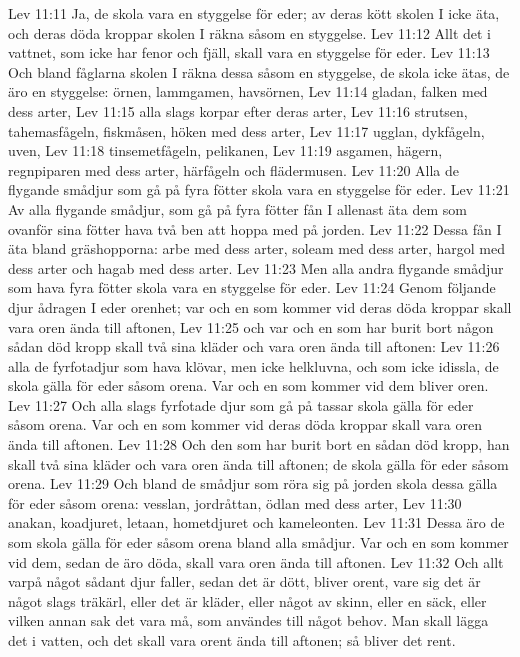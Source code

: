 Lev 11:11  Ja, de skola vara en styggelse för eder; av deras kött skolen I icke äta, och deras döda kroppar skolen I räkna såsom en styggelse.
Lev 11:12  Allt det i vattnet, som icke har fenor och fjäll, skall vara en styggelse för eder.
Lev 11:13  Och bland fåglarna skolen I räkna dessa såsom en styggelse, de skola icke ätas, de äro en styggelse: örnen, lammgamen, havsörnen,
Lev 11:14  gladan, falken med dess arter,
Lev 11:15  alla slags korpar efter deras arter,
Lev 11:16  strutsen, tahemasfågeln, fiskmåsen, höken med dess arter,
Lev 11:17  ugglan, dykfågeln, uven,
Lev 11:18  tinsemetfågeln, pelikanen,
Lev 11:19  asgamen, hägern, regnpiparen med dess arter, härfågeln och flädermusen.
Lev 11:20  Alla de flygande smådjur som gå på fyra fötter skola vara en styggelse för eder.
Lev 11:21  Av alla flygande smådjur, som gå på fyra fötter fån I allenast äta dem som ovanför sina fötter hava två ben att hoppa med på jorden.
Lev 11:22  Dessa fån I äta bland gräshopporna: arbe med dess arter, soleam med dess arter, hargol med dess arter och hagab med dess arter.
Lev 11:23  Men alla andra flygande smådjur som hava fyra fötter skola vara en styggelse för eder.
Lev 11:24  Genom följande djur ådragen I eder orenhet; var och en som kommer vid deras döda kroppar skall vara oren ända till aftonen,
Lev 11:25  och var och en som har burit bort någon sådan död kropp skall två sina kläder och vara oren ända till aftonen:
Lev 11:26  alla de fyrfotadjur som hava klövar, men icke helkluvna, och som icke idissla, de skola gälla för eder såsom orena. Var och en som kommer vid dem bliver oren.
Lev 11:27  Och alla slags fyrfotade djur som gå på tassar skola gälla för eder såsom orena. Var och en som kommer vid deras döda kroppar skall vara oren ända till aftonen.
Lev 11:28  Och den som har burit bort en sådan död kropp, han skall två sina kläder och vara oren ända till aftonen; de skola gälla för eder såsom orena.
Lev 11:29  Och bland de smådjur som röra sig på jorden skola dessa gälla för eder såsom orena: vesslan, jordråttan, ödlan med dess arter,
Lev 11:30  anakan, koadjuret, letaan, hometdjuret och kameleonten.
Lev 11:31  Dessa äro de som skola gälla för eder såsom orena bland alla smådjur. Var och en som kommer vid dem, sedan de äro döda, skall vara oren ända till aftonen.
Lev 11:32  Och allt varpå något sådant djur faller, sedan det är dött, bliver orent, vare sig det är något slags träkärl, eller det är kläder, eller något av skinn, eller en säck, eller vilken annan sak det vara må, som användes till något behov. Man skall lägga det i vatten, och det skall vara orent ända till aftonen; så bliver det rent.
